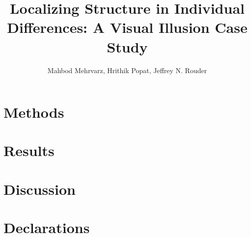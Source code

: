 \documentclass[man,12pt]{apa7}
\title{Localizing Structure in Individual Differences: A Visual Illusion Case Study}
\author{Mahbod Mehrvarz, Hrithik Popat, Jeffrey N. Rouder}
\affiliation{University of California, Irvine}
\begin{document}
\maketitle



\section*{Methods}



\section*{Results}



\section*{Discussion}




\printbibliography

\newpage




\newpage


\section*{Declarations}


\end{document}
